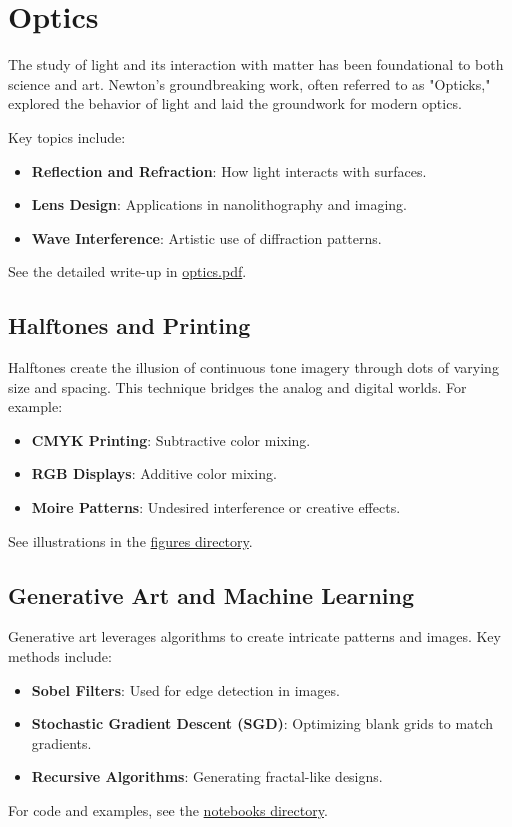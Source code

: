 \chapter{Optics}
The study of light and its interaction with matter has been foundational to both science and art. Newton's groundbreaking work, often referred to as "Opticks," explored the behavior of light and laid the groundwork for modern optics.

Key topics include:
\begin{itemize}
    \item \textbf{Reflection and Refraction}: How light interacts with surfaces.
    \item \textbf{Lens Design}: Applications in nanolithography and imaging.
    \item \textbf{Wave Interference}: Artistic use of diffraction patterns.
\end{itemize}
See the detailed write-up in \href{./optics.pdf}{optics.pdf}.

\section{Halftones and Printing}
Halftones create the illusion of continuous tone imagery through dots of varying size and spacing. This technique bridges the analog and digital worlds. For example:
\begin{itemize}
    \item \textbf{CMYK Printing}: Subtractive color mixing.
    \item \textbf{RGB Displays}: Additive color mixing.
    \item \textbf{Moire Patterns}: Undesired interference or creative effects.
\end{itemize}
See illustrations in the \href{./figures}{figures directory}.

\section{Generative Art and Machine Learning}
Generative art leverages algorithms to create intricate patterns and images. Key methods include:
\begin{itemize}
    \item \textbf{Sobel Filters}: Used for edge detection in images.
    \item \textbf{Stochastic Gradient Descent (SGD)}: Optimizing blank grids to match gradients.
    \item \textbf{Recursive Algorithms}: Generating fractal-like designs.
\end{itemize}
For code and examples, see the \href{./notebooks}{notebooks directory}.

